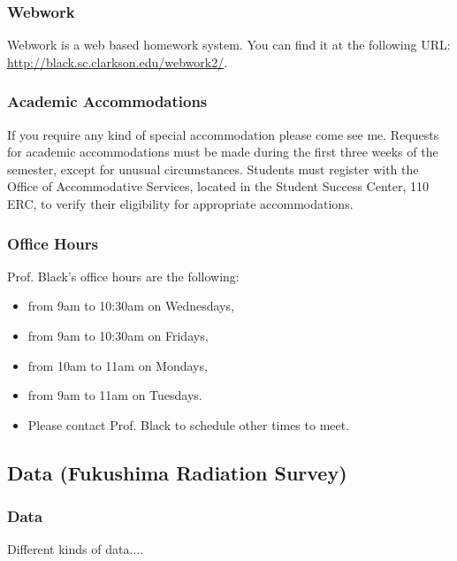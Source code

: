 \begin{frame}
  \frametitle{Webwork}

  Webwork is a web based homework system. You can find
  it at the following URL: \\
  \url{http://black.sc.clarkson.edu/webwork2/}.

\end{frame}


\begin{frame}
  \frametitle{Academic Accommodations}

  If you require any kind of special accommodation please come see me.
  Requests for academic accommodations must be made during the first
  three weeks of the semester, except for unusual circumstances.
  Students must register with the Office of Accommodative Services,
  located in the Student Success Center, 110 ERC, to verify their
  eligibility for appropriate accommodations.

\end{frame}

\begin{frame}
  \frametitle{Office Hours}

  Prof. Black's office hours are the following:
  \begin{itemize}
  \item from 9am to 10:30am on Wednesdays, 
  \item from 9am to 10:30am on Fridays,
  \item from 10am to 11am on Mondays,
  \item from 9am to 11am on Tuesdays.
  \item Please contact Prof. Black to schedule other times to
    meet.
  \end{itemize}

\end{frame}

\subsection{Data (Fukushima Radiation Survey)}

\begin{frame}
  \frametitle{Data}

  Different kinds of data....


\end{frame}

